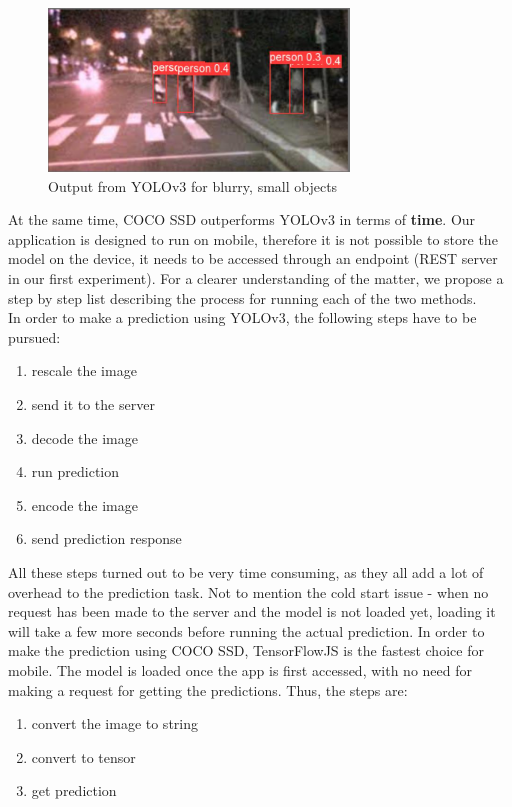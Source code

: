\documentclass[runningheads,a4paper,11pt]{report}
\begin{document}
\begin{figure}
\centering
\includegraphics[width=8cm]{images/image4_label.PNG}
\caption{Output from YOLOv3 for blurry, small objects}\label{fig:yoloBlur}
\end{figure}

At the same time, COCO SSD outperforms YOLOv3 in terms of \textbf{time}. Our application is designed to run on mobile, therefore it is not possible to store the model on the device, it needs to be accessed through an endpoint (REST server in our first experiment). For a clearer understanding of the matter, we propose a step by step list describing the process for running each of the two methods. \\
In order to make a prediction using YOLOv3, the following steps have to be pursued:
\begin{enumerate}
    \item rescale the image
    \item send it to the server
    \item decode the image
    \item run prediction
    \item encode the image
    \item send prediction response
\end{enumerate}
All these steps turned out to be very time consuming, as they all add a lot of overhead to the prediction task. Not to mention the cold start issue - when no request has been made to the server and the model is not loaded yet, loading it will take a few more seconds before running the actual prediction. In order to make the prediction using COCO SSD, TensorFlowJS is the fastest choice for mobile. The model is loaded once the app is first accessed, with no need for making a request for getting the predictions. Thus, the steps are:
\begin{enumerate}
    \item convert the image to string
    \item convert to tensor
    \item get prediction
\end{enumerate}
\end{document}
